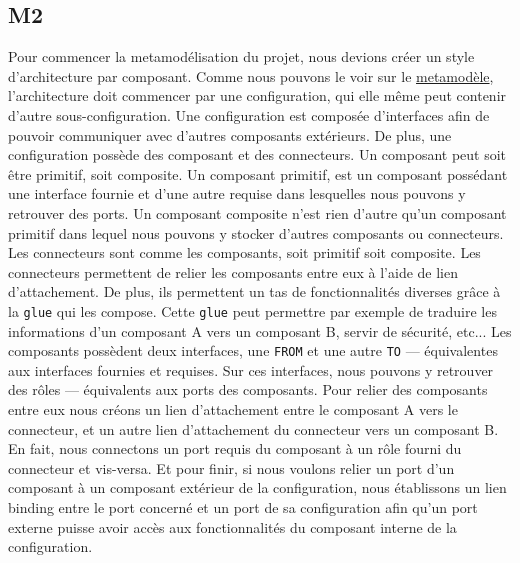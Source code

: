 \documentclass[11pt, a4paper, notitlepage]{article}
\newcommand\tab{\hspace*{10mm}}
\begin{document}
\subsection*{M2}
\tab Pour commencer la metamodélisation du projet, nous devions créer un style d'architecture par composant. Comme nous pouvons le voir sur le \href{run:../img/Asa_M2.png}{metamodèle}, l'architecture doit commencer par une configuration, qui elle même peut contenir d'autre sous-configuration. Une configuration est composée d'interfaces afin de pouvoir communiquer avec d'autres composants extérieurs. De plus, une configuration possède des composant et des connecteurs. Un composant peut soit être primitif, soit composite. Un composant primitif, est un composant possédant une interface fournie et d'une autre requise dans lesquelles nous pouvons y retrouver des ports. Un composant composite n'est rien d'autre qu'un composant primitif dans lequel nous pouvons y stocker d'autres composants ou connecteurs. Les connecteurs sont comme les composants, soit primitif soit composite. Les connecteurs permettent de relier les composants entre eux à l'aide de lien d'attachement. De plus, ils permettent un tas de fonctionnalités diverses grâce à la \verb"glue" qui les compose. Cette \verb"glue" peut permettre par exemple de traduire les informations d'un composant A vers un composant B, servir de sécurité, etc... Les composants possèdent deux interfaces, une \verb"FROM" et une autre \verb"TO" --- équivalentes aux interfaces fournies et requises. Sur ces interfaces, nous pouvons y retrouver des rôles --- équivalents aux ports des composants. Pour relier des composants entre eux nous créons un lien d'attachement entre le composant A vers le connecteur, et un autre lien d'attachement du connecteur vers un composant B. En fait, nous connectons un port requis du composant à un rôle fourni du connecteur et vis-versa. Et pour finir, si nous voulons relier un port d'un composant à un composant extérieur de la configuration, nous établissons un lien binding entre le port concerné et un port de sa configuration afin qu'un port externe puisse avoir accès aux fonctionnalités du composant interne de la configuration.
\end{document}
